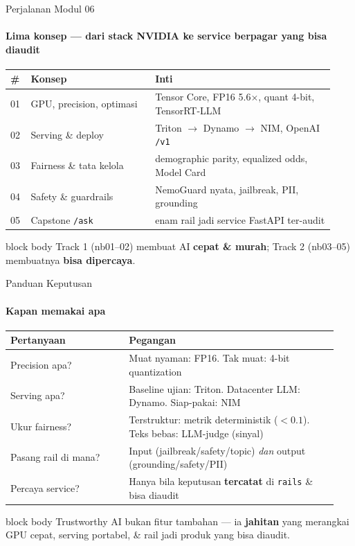 \documentclass[aspectratio=169,t]{beamer}
\newcommand{\takeaway}[1]{%
  \vspace{0.3em}
  \begin{beamercolorbox}[rounded=true,shadow=false,sep=6pt]{block body}
    \centering\small\color{nvlightgreen}#1
  \end{beamercolorbox}%
}
\begin{document}
\begin{frame}{Perjalanan Modul 06}
  \framesubtitle{Lima konsep --- dari stack NVIDIA ke service berpagar yang bisa diaudit}
  \begin{center}
  \renewcommand{\arraystretch}{1.25}{\footnotesize\setlength{\tabcolsep}{6pt}
  \begin{tabular}{@{}p{0.05\linewidth}p{0.36\linewidth}p{0.52\linewidth}@{}}
    \toprule \rowcolor{nvcard!50}
    \textbf{\#} & \textbf{Konsep} & \textbf{Inti} \\ \midrule
    01 & GPU, precision, optimasi & Tensor Core, FP16 5.6$\times$, quant 4-bit, TensorRT-LLM \\
    02 & Serving \& deploy & Triton $\to$ Dynamo $\to$ NIM, OpenAI \texttt{/v1} \\
    03 & Fairness \& tata kelola & demographic parity, equalized odds, Model Card \\
    04 & Safety \& guardrails & NemoGuard nyata, jailbreak, PII, grounding \\
    05 & Capstone \texttt{/ask} & enam rail jadi service FastAPI ter-audit \\
    \bottomrule
  \end{tabular}}
  \end{center}
  \takeaway{Track 1 (nb01--02) membuat AI \textbf{cepat \& murah}; Track 2 (nb03--05) membuatnya \textbf{bisa dipercaya}.}
\end{frame}

\begin{frame}{Panduan Keputusan}
  \framesubtitle{Kapan memakai apa}
  \begin{center}
  \renewcommand{\arraystretch}{1.3}{\footnotesize\setlength{\tabcolsep}{5pt}
  \begin{tabular}{@{}>{\raggedright\arraybackslash}p{0.34\linewidth}>{\raggedright\arraybackslash}p{0.60\linewidth}@{}}
    \toprule \rowcolor{nvcard!50}
    \textbf{Pertanyaan} & \textbf{Pegangan} \\ \midrule
    Precision apa? & Muat nyaman: FP16. Tak muat: 4-bit quantization \\
    Serving apa? & Baseline ujian: Triton. Datacenter LLM: Dynamo. Siap-pakai: NIM \\
    Ukur fairness? & Terstruktur: metrik deterministik ($< 0.1$). Teks bebas: LLM-judge (sinyal) \\
    Pasang rail di mana? & Input (jailbreak/safety/topic) \emph{dan} output (grounding/safety/PII) \\
    Percaya service? & Hanya bila keputusan \textbf{tercatat} di \texttt{rails} \& bisa diaudit \\
    \bottomrule
  \end{tabular}}
  \end{center}
  \takeaway{Trustworthy AI bukan fitur tambahan --- ia \textbf{jahitan} yang merangkai GPU cepat, serving portabel, \& rail jadi produk yang bisa diaudit.}
\end{frame}
\end{document}
